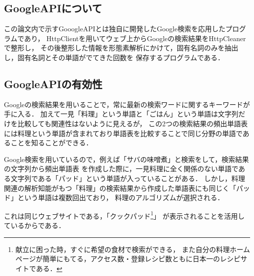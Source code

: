\subsection{GoogleAPIについて}
この論文内で示すGooogleAPIとは独自に開発したGoogle検索を応用したプログラムであり，
HttpClientを用いてウェブ上からGoogleの検索結果をHttpCleanerで整形し，
その後整形した情報を形態素解析にかけて，固有名詞のみを抽出し，固有名詞とその単語がでてきた回数を
保存するプログラムである．

\subsection{GoogleAPIの有効性}
Googleの検索結果を用いることで，常に最新の検索ワードに関するキーワードが手に入る．
加えて一見「料理」という単語と「ごはん」という単語は文字列だけを比較しても関連性はないように見えるが，
この2つの検索結果の頻出単語表には料理という単語が含まれており単語表を比較することで同じ分野の単語であることを知ることができる．

Google検索を用いているので，例えば「サバの味噌煮」と検索をして，検索結果の文字列から頻出単語表
を作成した際に，一見料理に全く関係のない単語である文字列である「パッド」という単語が入っていることがある．
しかし，料理関連の解析知能がもつ「料理」の検索結果から作成した単語表にも同じく「パッド」という単語は複数回出ており，
料理のアルゴリズムが選択される．

これは同じウェブサイトである，「クックパッド\footnote{献立に困った時，すぐに希望の食材で検索ができる，
また自分の料理ホームページが簡単にもてる，アクセス数・登録レシピ数ともに日本一のレシピサイトである．}」
が表示されることを活用しているからである．